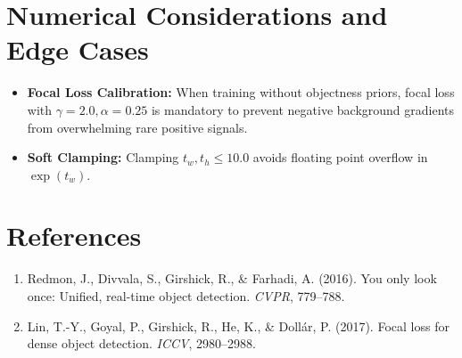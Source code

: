 \documentclass[11pt,a4paper]{article}
\theoremstyle{definition}
\begin{document}
\section{Numerical Considerations and Edge Cases}

\begin{itemize}
    \item \textbf{Focal Loss Calibration:} When training without objectness priors, focal loss with $\gamma = 2.0, \alpha = 0.25$ is mandatory to prevent negative background gradients from overwhelming rare positive signals.
    \item \textbf{Soft Clamping:} Clamping $t_w, t_h \le 10.0$ avoids floating point overflow in $\exp(t_w)$.
\end{itemize}

\section{References}
\begin{enumerate}
    \item Redmon, J., Divvala, S., Girshick, R., & Farhadi, A. (2016). You only look once: Unified, real-time object detection. \emph{CVPR}, 779--788.
    \item Lin, T.-Y., Goyal, P., Girshick, R., He, K., & Doll{\'a}r, P. (2017). Focal loss for dense object detection. \emph{ICCV}, 2980--2988.
\end{enumerate}
\end{document}
